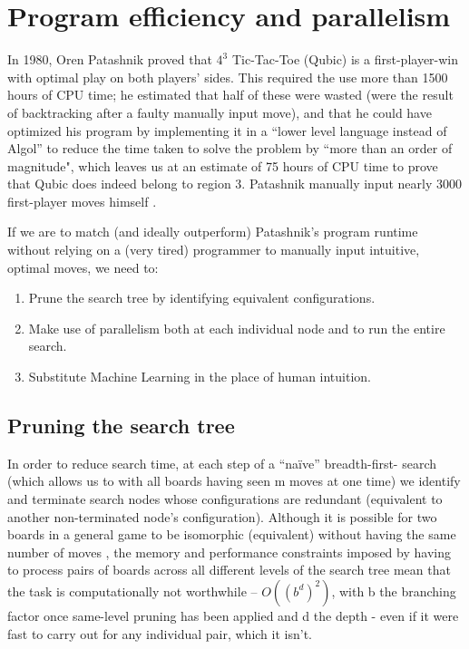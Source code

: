 \documentclass[english, 11pt]{article}
\begin{document}
\section{Program efficiency and parallelism}

In 1980, Oren Patashnik proved that $4^3$ Tic-Tac-Toe (Qubic) is a first-player-win with optimal play on both players’ sides. This required the use more than 1500 hours of CPU time; he estimated that half of these were wasted (were the result of backtracking after a faulty manually input move), and that he could have optimized his program by implementing it in a “lower level language instead of Algol” to reduce the time taken to solve the problem by ``more than an order of magnitude", which leaves us at an estimate of 75 hours of CPU time to prove that Qubic does indeed belong to region 3. Patashnik manually input nearly 3000 first-player moves himself \cite{patash}. 

If we are to match (and ideally outperform) Patashnik’s program runtime without relying on a (very tired) programmer to manually input intuitive, optimal moves, we need to:
\begin{enumerate}
	\item Prune the search tree by identifying equivalent configurations.
	\item Make use of parallelism both at each individual node and to run the entire search.
	\item Substitute Machine Learning in the place of human intuition.
\end{enumerate}

\subsection{Pruning the search tree}
In order to reduce search time, at each step of a “naïve” breadth-first- search (which allows us to with all boards having seen m moves at one time) we identify and terminate search nodes whose configurations are redundant (equivalent to another non-terminated node’s configuration)\cite{patash}. 
Although it is possible for two boards in a general game to be isomorphic (equivalent) without having the same number of moves \cite{antoy}, the memory and performance constraints imposed by having to process pairs of boards across all different levels of the search tree mean that the task is computationally not worthwhile – $O((b^d)^2)$, with b the branching factor once same-level pruning has been applied and d the depth - even if it were fast to carry out for any individual pair, which it isn’t. 
\end{document}
